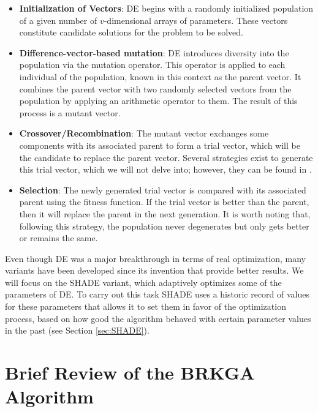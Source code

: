\documentclass[review]{elsarticle}
\begin{document}
\begin{itemize}
	
	\item \textbf{Initialization of Vectors}: DE begins with a randomly initialized population of a given number of $v$-dimensional arrays of parameters. These vectors constitute candidate solutions for the problem to be solved.
	
	\item \textbf{Difference-vector-based mutation}: DE introduces diversity into the population via the mutation operator. This operator is applied to each individual of the population, known in this context as the parent vector. It combines the parent vector with two randomly selected vectors from the population by applying an arithmetic operator to them. The result of this process is a mutant vector.
	
	\item \textbf{Crossover/Recombination}: The mutant vector exchanges some components with its associated parent to form a trial vector, which will be the candidate to replace the parent vector. Several strategies exist to generate this trial vector, which we will not delve into; however, they can be found in \cite{das2011differential}.
	
	\item \textbf{Selection}: The newly generated trial vector is compared with its associated parent using the fitness function. If the trial vector is better than the parent, then it will replace the parent in the next generation. It is worth noting that, following this strategy, the population never degenerates but only gets better or remains the same.
	
\end{itemize}

Even though DE was a major breakthrough in terms of real optimization, many variants have been developed since its invention that provide better results. We will focus on the SHADE variant, which adaptively optimizes some of the parameters of DE. To carry out this task SHADE uses a historic record of values for these parameters that allows it to set them in favor of the optimization process, based on how good the algorithm behaved with certain parameter values in the past (see Section \ref{sec:SHADE}).



\section{Brief Review of the BRKGA Algorithm} \label{sec:brkga}
\end{document}

